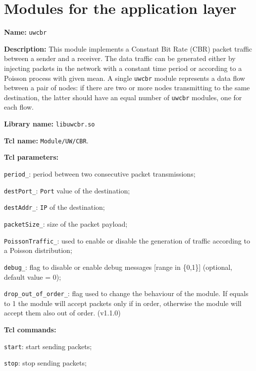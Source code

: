\section{Modules for the application layer}\label{sec:application}

\begin{description}
   \item {\bf Name:} {\tt uwcbr}
   \item {\bf Description:} This module implements a Constant Bit Rate (CBR) packet traffic between a sender and a receiver. The data traffic can be generated either by injecting packets in the network with a constant time period or according to a Poisson process with given mean. A single {\tt uwcbr} module represents a data flow between a pair of nodes: if there are two or more nodes transmitting to the same destination, the latter should have an equal number of {\tt uwcbr} modules, one for each flow. 
   \item {\bf Library name:} {\tt libuwcbr.so}
   \item {\bf Tcl name:} {\tt Module/UW/CBR}.
   \item {\bf Tcl parameters:} 
   \begin{description}
    \item {\tt period\_}: period between two consecutive packet transmissions;
    \item {\tt destPort\_}: {\tt Port} value of the destination;
    \item {\tt destAddr\_}: {\tt IP} of the destination;
    \item {\tt packetSize\_}: size of the packet payload;
    \item {\tt PoissonTraffic\_}: used to enable or disable the generation of traffic according to a Poisson distribution;
    \item {\tt debug\_}: flag to disable or enable debug messages [range in \{0,1\}] (optional, default value = 0);
    \item {\tt drop\_out\_of\_order\_}: flag used to change the behaviour of the module. If equals to 1 the module will accept packets only if in order, otherwise the module will accept them also out of order. (v1.1.0)
   \end{description}
   \item {\bf Tcl commands:}
   \begin{description}
    \item {\tt start}: start sending packets;
    \item {\tt stop}: stop sending packets;

\end{description}
\end{description}
